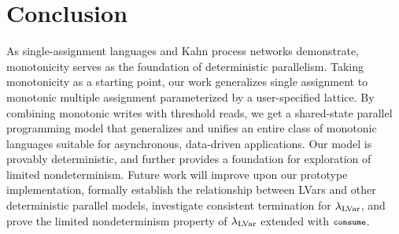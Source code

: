\section{Conclusion}


As single-assignment languages and Kahn process networks demonstrate,
monotonicity serves as the foundation of deterministic parallelism.
Taking monotonicity as a starting point, our work generalizes single
assignment to monotonic multiple assignment parameterized by a
user-specified lattice.  By combining monotonic writes with threshold
reads, we get a shared-state parallel programming model that
generalizes and unifies an entire class of monotonic languages
suitable for asynchronous, data-driven applications.  Our model is
provably deterministic, and further provides a foundation for
exploration of limited nondeterminism.  Future work will improve upon
our prototype implementation, formally establish the relationship between
LVars and other deterministic parallel models,
investigate consistent termination for $\textup{\ensuremath{\lambda_{\textrm{LVar}}}}$,
and prove the
limited nondeterminism property of $\textup{\ensuremath{\lambda_{\textrm{LVar}}}}$ extended with $\mbox{\footnotesize \texttt{consume}}$.


